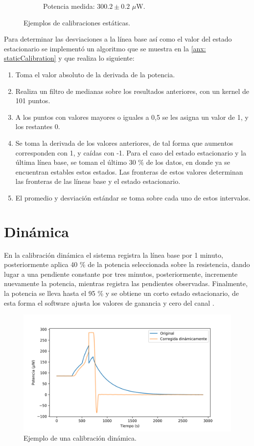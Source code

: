 \begin{figure}[h]
\begin{subfigure}{0.45\linewidth}
			\caption{Potencia medida: $300.2 \pm 0.2$ $\mu$W.}
			\label{fig: noZeroCal}
		\end{subfigure}
		\caption{Ejemplos de calibraciones estáticas.}
		\label{fig: staticCalibrations}
	\end{figure}

	\newpage
	Para determinar las desviaciones a la línea base así como el valor del estado estacionario se implementó un algoritmo que se muestra en la \autoref{anx: staticCalibration} y que realiza lo siguiente:
	\begin{enumerate}
		\item Toma el valor absoluto de la derivada de la potencia.
		\item Realiza un filtro de medianas sobre los resultados anteriores, con un kernel de 101 puntos.
		\item A los puntos con valores mayores o iguales a 0,5 se les asigna un valor de 1, y los restantes 0.
		\item Se toma la derivada de los valores anteriores, de tal forma que aumentos corresponden con 1, y caídas con -1. Para el caso del estado estacionario y la última línea base, se toman el último 30 \% de los datos, en donde ya se encuentran estables estos estados. Las fronteras de estos valores determinan las fronteras de las líneas base y el estado estacionario.
		\item El promedio y desviación estándar se toma sobre cada uno de estos intervalos.
	\end{enumerate}
	
	\newpage
	\section{Din\'amica}
	En la calibración dinámica el sistema registra la línea base por 1 minuto, posteriormente aplica 40 \% de la potencia seleccionada sobre la resistencia, dando lugar a una pendiente constante por tres minutos, posteriormente, incremente nuevamente la potencia, mientras registra las pendientes observadas. Finalmente, la potencia se lleva hasta el 95 \% y se obtiene un corto estado estacionario, de esta forma el software ajusta los valores de ganancia y cero del canal \cite{Suurkuusk}. 
	\begin{figure}[h]
		\centering
		\includegraphics[width=\linewidth]{../Data/ElectricalCalibrations/Dynamic/dynamic}
		\caption{Ejemplo de una calibración dinámica.}
		\label{fig: dynamicCalibration}
	\end{figure}

